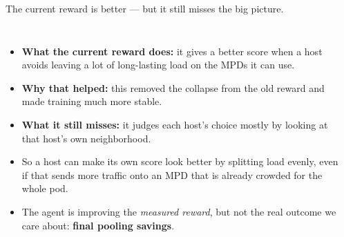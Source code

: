\documentclass[11pt,aspectratio=43]{beamer}
\begin{document}
\begin{frame}[shrink=6]{The current reward is better --- but it still misses the big picture.}

  \begin{columns}[T,onlytextwidth]

      \vspace{0.3em}
      \small
      \begin{itemize}
        \setlength{\itemsep}{0.55em}
        \item \textbf{What the current reward does:} it gives a better score when a
              host avoids leaving a lot of long-lasting load on the MPDs it can use.
        \item \textbf{Why that helped:} this removed the collapse from the old reward
              and made training much more stable.
        \item \textbf{What it still misses:} it judges each host's choice mostly
              by looking at that host's own neighborhood.
        \item So a host can make its own score look better by splitting load
              evenly, even if that sends more traffic onto an MPD that is already
              crowded for the whole pod.
        \item The agent is improving the \emph{measured reward}, but not the real
              outcome we care about: \textbf{final pooling savings}.
      \end{itemize}

      \begin{center}
\end{center}
\end{columns}
\end{frame}
\end{document}
